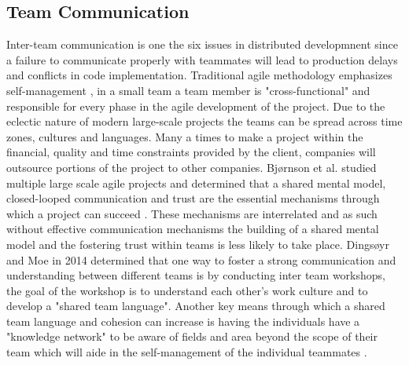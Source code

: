 \documentclass[sigplan,screen]{acmart}
\begin{document}
\subsection{Team Communication}
Inter-team communication is one the six issues in distributed developmnent \cite{Jeff} since a failure to communicate properly with teammates will lead to production delays and conflicts in code implementation. Traditional agile methodology emphasizes self-management \cite{Dingsøyr14}, in a small team a team member is "cross-functional" and responsible for every phase in the agile development of the project. Due to the eclectic nature of modern large-scale projects the teams can be spread across time zones, cultures and languages. Many a times to make a project within the financial, quality and time constraints provided by the client, companies will outsource portions of the project to other companies.  Bj{\o}rnson et al. studied multiple large scale agile projects and determined that a shared mental model, closed-looped communication and trust are the essential mechanisms through which a project can succeed \cite{Bjørnson}. These mechanisms are interrelated and as such without effective communication mechanisms the building of a shared mental model and the fostering trust within teams is less likely to take place. Dings{\o}yr and Moe in 2014 determined that one way to foster a strong communication and understanding between different teams is by conducting inter team workshops, the goal of the workshop is to understand each other's work  culture and to develop a "shared team language"\cite{Dingsøyr14}. Another key means through which a shared team language and cohesion can increase is having the individuals have a "knowledge network" to be aware of fields and area beyond the scope of their team which will aide in the self-management of the individual teammates \cite{Dingsøyr14}.\\
\end{document}
